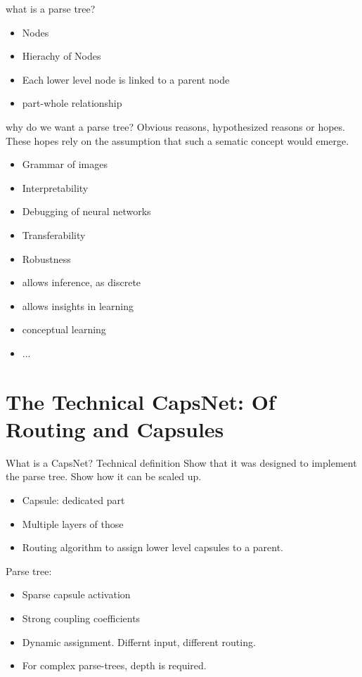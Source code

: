 \documentclass{article}
\begin{document}
what is a parse tree?
\begin{itemize}
	\item Nodes
	\item Hierachy of Nodes
	\item Each lower level node is linked to a parent node
	\item part-whole relationship
\end{itemize}
why do we want a parse tree? Obvious reasons, hypothesized reasons or hopes. These hopes rely on the assumption that such a sematic concept would emerge.
\begin{itemize}
	\item Grammar of images
	\item Interpretability
	\item Debugging of neural networks
	\item Transferability
	\item Robustness
	\item allows inference, as discrete
	\item allows insights in learning
	\item conceptual learning
	\item ...
\end{itemize}

\section{The Technical CapsNet: Of Routing and Capsules}

What is a CapsNet? Technical definition
Show that it was designed to implement the parse tree.
Show how it can be scaled up.

\begin{itemize}
	\item Capsule: dedicated part
	\item Multiple layers of those
	\item Routing algorithm to assign lower level capsules to a parent.
\end{itemize}

Parse tree:
\begin{itemize}
	\item Sparse capsule activation
	\item Strong coupling coefficients
	\item Dynamic assignment. Differnt input, different routing.
	\item For complex parse-trees, depth is required.
\end{itemize}
\end{document}

